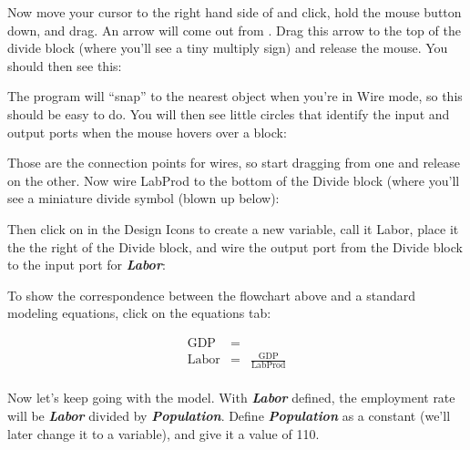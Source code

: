 Now move your cursor to the right hand side of
  and click, hold the mouse button down, and
drag. An arrow will come out from  . Drag
this arrow to the top of the divide block (where you'll see a tiny
multiply sign) and release the mouse. You should then see this: 

\begin{center}
\end{center}


The program will ``snap'' to the nearest object when you're in Wire
mode, so this should be easy to do. You will then see little
circles that identify the input and output ports when the mouse hovers over a block: 

\begin{center}
\end{center}

Those are the connection points for wires, so start dragging from one
and release on the other. Now wire LabProd to the bottom of the Divide
block (where you'll see a miniature divide symbol (blown up below): 

\begin{center}
\end{center}

Then click on  in the Design Icons to create a new variable, call it
Labor, place it the the right of the Divide block, and wire the output port from the Divide block to the
input port for {\bf\em Labor}: 

\begin{center}
\end{center}


To show the correspondence between the flowchart above and a standard
modeling equations, click on the equations tab: 

\begin{eqnarray*}
\mathrm{GDP}&=&\\
\mathrm{Labor}&=&\frac{\mathrm{GDP}}{\mathrm{LabProd}}\\
\end{eqnarray*}

Now let's keep going with the model. With {\bf\em Labor} defined, the
employment rate will be {\bf\em  Labor} divided by {\bf\em
Population}. Define {\bf\em Population} as a constant (we'll later
change it to a variable), and give it a value of 110. 


